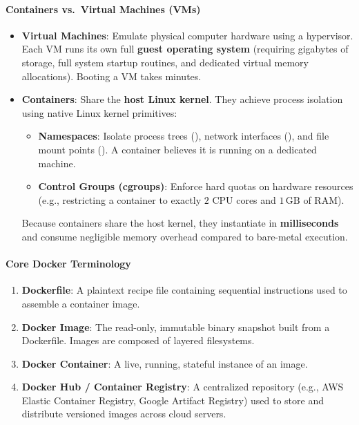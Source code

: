 \paragraph{Containers vs.\ Virtual Machines (VMs)}
\begin{itemize}
    \item \textbf{Virtual Machines}: Emulate physical computer hardware using a hypervisor. Each VM runs its own full \textbf{guest operating system} (requiring gigabytes of storage, full system startup routines, and dedicated virtual memory allocations). Booting a VM takes minutes.
    \item \textbf{Containers}: Share the \textbf{host Linux kernel}. They achieve process isolation using native Linux kernel primitives:
    \begin{itemize}
        \item \textbf{Namespaces}: Isolate process trees (), network interfaces (), and file mount points (). A container believes it is running on a dedicated machine.
        \item \textbf{Control Groups (cgroups)}: Enforce hard quotas on hardware resources (e.g., restricting a container to exactly $2$ CPU cores and $1\,\text{GB}$ of RAM).
    \end{itemize}
    Because containers share the host kernel, they instantiate in \textbf{milliseconds} and consume negligible memory overhead compared to bare-metal execution.
\end{itemize}

\paragraph{Core Docker Terminology}
\begin{enumerate}
    \item \textbf{Dockerfile}: A plaintext recipe file containing sequential instructions used to assemble a container image.
    \item \textbf{Docker Image}: The read-only, immutable binary snapshot built from a Dockerfile. Images are composed of layered filesystems.
    \item \textbf{Docker Container}: A live, running, stateful instance of an image.
    \item \textbf{Docker Hub / Container Registry}: A centralized repository (e.g., AWS Elastic Container Registry, Google Artifact Registry) used to store and distribute versioned images across cloud servers.
\end{enumerate}

